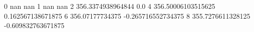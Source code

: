 0 nan nan
1 nan nan
2 356.3374938964844 0.0
4 356.50006103515625 0.162567138671875
6 356.07177734375 -0.265716552734375
8 355.7276611328125 -0.609832763671875
